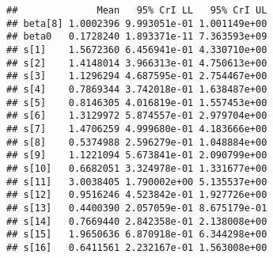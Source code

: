 \documentclass[]{article}
\newenvironment{Shaded}{\begin{snugshade}}{\end{snugshade}}
\newcommand{\CommentTok}[1]{\textcolor[rgb]{0.56,0.35,0.01}{\textit{#1}}}
\newcommand{\ControlFlowTok}[1]{\textcolor[rgb]{0.13,0.29,0.53}{\textbf{#1}}}
\newcommand{\DataTypeTok}[1]{\textcolor[rgb]{0.13,0.29,0.53}{#1}}
\newcommand{\DecValTok}[1]{\textcolor[rgb]{0.00,0.00,0.81}{#1}}
\newcommand{\FloatTok}[1]{\textcolor[rgb]{0.00,0.00,0.81}{#1}}
\newcommand{\KeywordTok}[1]{\textcolor[rgb]{0.13,0.29,0.53}{\textbf{#1}}}
\newcommand{\NormalTok}[1]{#1}
\newcommand{\OperatorTok}[1]{\textcolor[rgb]{0.81,0.36,0.00}{\textbf{#1}}}
\newcommand{\StringTok}[1]{\textcolor[rgb]{0.31,0.60,0.02}{#1}}
\begin{document}
\begin{Shaded}
\end{Shaded}

\begin{verbatim}
##              Mean   95% CrI LL   95% CrI UL
## beta[8] 1.0002396 9.993051e-01 1.001149e+00
## beta0   0.1728240 1.893371e-11 7.363593e+09
## s[1]    1.5672360 6.456941e-01 4.330710e+00
## s[2]    1.4148014 3.966313e-01 4.750613e+00
## s[3]    1.1296294 4.687595e-01 2.754467e+00
## s[4]    0.7869344 3.742018e-01 1.638487e+00
## s[5]    0.8146305 4.016819e-01 1.557453e+00
## s[6]    1.3129972 5.874557e-01 2.979704e+00
## s[7]    1.4706259 4.999680e-01 4.183666e+00
## s[8]    0.5374988 2.596279e-01 1.048884e+00
## s[9]    1.1221094 5.673841e-01 2.090799e+00
## s[10]   0.6682051 3.324978e-01 1.331677e+00
## s[11]   3.0038405 1.790002e+00 5.135537e+00
## s[12]   0.9516246 4.523842e-01 1.927726e+00
## s[13]   0.4400390 2.057059e-01 8.675179e-01
## s[14]   0.7669440 2.842358e-01 2.138008e+00
## s[15]   1.9650636 6.870918e-01 6.344298e+00
## s[16]   0.6411561 2.232167e-01 1.563008e+00
\end{verbatim}
\end{document}
